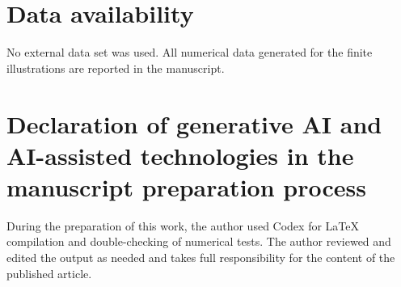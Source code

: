 \documentclass[preprint,12pt]{elsarticle}
\numberwithin{equation}{section}
\theoremstyle{plain}
\theoremstyle{definition}
\theoremstyle{remark}
\begin{document}
\section*{Data availability}
No external data set was used. All numerical data generated for the finite illustrations are
reported in the manuscript.

\section*{Declaration of generative AI and AI-assisted technologies in the manuscript preparation process}
During the preparation of this work, the author used Codex for \LaTeX{} compilation and
double-checking of numerical tests. The author reviewed and edited the output as needed and takes
full responsibility for the content of the published article.
\end{document}
